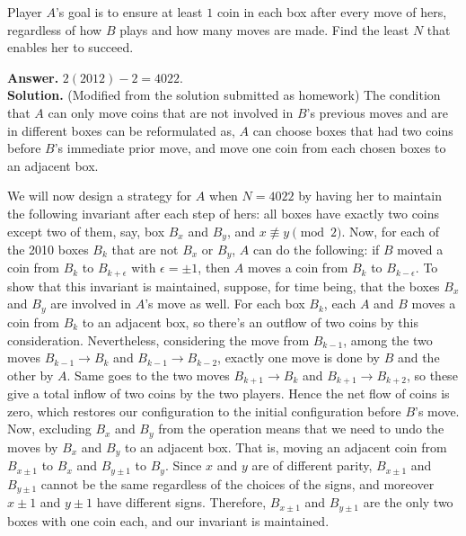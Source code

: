\documentclass[11pt,a4paper]{article}
\begin{document}
\begin{enumerate}
		Player $A$'s goal is to ensure at least $1$ coin in each box after every move of hers, regardless of how $B$ plays and how many moves are made. Find the least $N$ that enables her to succeed.
		
		\textbf{Answer.} $2(2012)-2=4022$. \\
		\textbf{Solution.} (Modified from the solution submitted as homework) The condition that $A$ can only move coins that are not involved in $B$'s previous moves and are in different boxes can be reformulated as, $A$ can choose boxes that had two coins before $B$'s immediate prior move, and move one coin from each chosen boxes to an adjacent box. 
		
		We will now design a strategy for $A$ when $N=4022$ by having her to maintain the following invariant after each step of hers: all boxes have exactly two coins except two of them, say, box $B_x$ and $B_y$, and $x\not\equiv y\pmod{2}$. Now, for each of the 2010 boxes $B_k$ that are not $B_x$ or $B_y$, $A$ can do the following: if $B$ moved a coin from $B_k$ to $B_{k+\epsilon}$ with $\epsilon=\pm 1$, then $A$ moves a coin from $B_k$ to $B_{k-\epsilon}$. 
		To show that this invariant is maintained, suppose, for time being, that the boxes $B_x$ and $B_y$ are involved in $A$'s move as well. For each box $B_k$, each $A$ and $B$ moves a coin from $B_k$ to an adjacent box, so there's an outflow of two coins by this consideration. 
		Nevertheless, considering the move from $B_{k-1}$, among the two moves $B_{k-1}\to B_k$ and $B_{k-1}\to B_{k-2}$, exactly one move is done by $B$ and the other by $A$. Same goes to the two moves $B_{k+1}\to B_k$ and $B_{k+1}\to B_{k+2}$, so these give a total inflow of two coins by the two players. Hence the net flow of coins is zero, which restores our configuration to the initial configuration before $B$'s move. Now, excluding $B_x$ and $B_y$ from the operation means that we need to undo the moves by $B_x$ and $B_y$ to an adjacent box. That is, moving an adjacent coin from $B_{x\pm 1}$ to $B_x$ and $B_{y\pm 1}$ to $B_y$. Since $x$ and $y$ are of different parity, $B_{x\pm 1}$ and $B_{y\pm 1}$ cannot be the same regardless of the choices of the signs, and moreover $x\pm 1$ and $y\pm 1$ have different signs. Therefore, $B_{x\pm 1}$ and $B_{y\pm 1}$ are the only two boxes with one coin each, and our invariant is maintained. 
		
		
	\end{enumerate}
	
\end{document}
